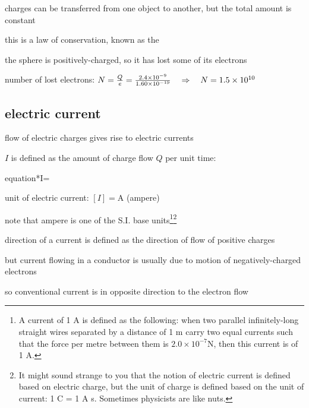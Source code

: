 charges can be transferred from one object to another, but the total amount is constant

this is a law of conservation, known as the 



\sol the sphere is positively-charged, so it has lost some of its electrons

number of lost electrons: $ N = \frac{Q}{e} = \frac{2.4\times10^{-9}}{1.60 \times10^{-19}} \quad \Rightarrow \quad N = 1.5 \times 10^{10}  $ \eoe



\subsection{electric current}

flow of electric charges gives rise to electric currents

\begin{ilight}
	\centering {} $I$ is defined as the amount of charge flow $Q$ per unit time: \begin{empheq}[box=\tcbhighmath]{equation*}{I=}\end{empheq}
\end{ilight}


\cmt unit of electric current: $[I] = \text{A}$ (ampere)

note that ampere is one of the S.I. base units\footnote{A current of 1 A is defined as the following: when two parallel infinitely-long straight wires separated by a distance of 1 m carry two equal currents such that the force per metre between them is $2.0\times10^{-7}$N, then this current is of 1 A.}\footnote{It might sound strange to you that the notion of electric current is defined based on electric charge, but the unit of charge is defined based on the unit of current: 1 C = 1 A s. Sometimes physicists are like nuts.}

\cmt direction of a current is defined as the direction of flow of positive charges

but current flowing in a conductor is usually due to motion of negatively-charged electrons

so conventional current is in opposite direction to the electron flow

